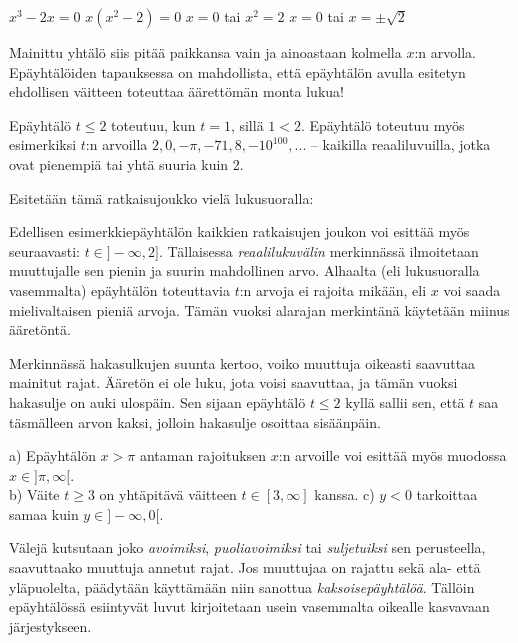 $x^3-2x=0$
$x(x^2-2)=0$
$x=0$ tai $x^2=2$
$x=0$ tai $x=\pm \sqrt{2}$

Mainittu yhtälö siis pitää paikkansa vain ja ainoastaan kolmella $x$:n arvolla. Epäyhtälöiden tapauksessa on mahdollista, että epäyhtälön avulla esitetyn ehdollisen väitteen toteuttaa äärettömän monta lukua!

\begin{esimerkki}
Epäyhtälö $t \leq 2$ toteutuu, kun $t=1$, sillä $1<2$. Epäyhtälö toteutuu myös esimerkiksi $t$:n arvoilla $2, 0, -\pi, -71,8, -10^{100}, ...$ – kaikilla reaaliluvuilla, jotka ovat pienempiä tai yhtä suuria kuin 2.
\end{esimerkki}

Esitetään tämä ratkaisujoukko vielä lukusuoralla:

\begin{lukusuora}{-6}{10}{6}
\end{lukusuora}

Edellisen esimerkkiepäyhtälön kaikkien ratkaisujen joukon voi esittää myös seuraavasti: $t\in ]-\infty, 2]$. Tällaisessa \emph{reaalilukuvälin} merkinnässä ilmoitetaan muuttujalle sen pienin ja suurin mahdollinen arvo. Alhaalta (eli lukusuoralla vasemmalta) epäyhtälön toteuttavia $t$:n arvoja ei rajoita mikään, eli $x$ voi saada mielivaltaisen pieniä arvoja. Tämän vuoksi alarajan merkintänä käytetään miinus ääretöntä.

Merkinnässä hakasulkujen suunta kertoo, voiko muuttuja oikeasti saavuttaa mainitut rajat. Ääretön ei ole luku, jota voisi saavuttaa, ja tämän vuoksi hakasulje on auki ulospäin. Sen sijaan epäyhtälö $t \leq 2$ kyllä sallii sen, että $t$ saa täsmälleen arvon kaksi, jolloin hakasulje osoittaa sisäänpäin.

\begin{esimerkki}
a) Epäyhtälön $x>\pi$ antaman rajoituksen $x$:n arvoille voi esittää myös muodossa $x \in ]\pi, \infty [$. \\
b) Väite $t \geq 3$ on yhtäpitävä väitteen $t \in [3, \infty]$ kanssa.
c) $y<0$ tarkoittaa samaa kuin $y \in ]-\infty,0[$.
\end{esimerkki}

Välejä kutsutaan joko \emph{avoimiksi}, \emph{puoliavoimiksi} tai \emph{suljetuiksi} sen perusteella, saavuttaako muuttuja annetut rajat. Jos muuttujaa on rajattu sekä ala- että yläpuolelta, päädytään käyttämään niin sanottua \emph{kaksoisepäyhtälöä}. Tällöin epäyhtälössä esiintyvät luvut kirjoitetaan usein vasemmalta oikealle kasvavaan järjestykseen.


